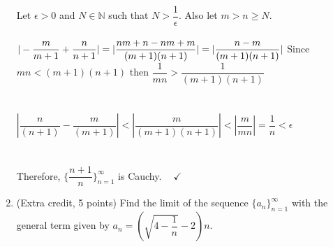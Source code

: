 \documentclass[fleqn]{article}
\begin{document}
\begin{enumerate}
      \textcolor{hwColor}{
        Let $\epsilon>0$ and $N \in \mathbb{N}$ such that $N >\dfrac{1}{\epsilon}$. Also let $m>n\geq N$.
        \\
        \\
        $
          |-\dfrac{m}{m+1}+\dfrac{n}{n+1}|=|\dfrac{nm+n-nm+m}{(m+1)(n+1)}|
          =|\dfrac{n-m}{(m+1)(n+1)}|
          \\
          \\
          \\
        $ 
        Since $mn<(m+1)(n+1)$ then $\dfrac{1}{mn}>\dfrac{1}{(m+1)(n+1)}$
        \\
        \\
        \\
        $
          |\dfrac{n}{(n+1)}-\dfrac{m}{(m+1)}|<|\dfrac{m}{(m+1)(n+1)}|<|\dfrac{m}{mn}|=\dfrac{1}{n}<\epsilon
        $
        \\
        \\
        \\
        Therefore, $\{\dfrac{n+1}{n}\}_{n=1}^{\infty}$ is Cauchy. $~~~~ \checkmark$
      }


    \item (Extra credit, 5 points) Find the limit of the sequence $\{a_n\}_{n=1}^{\infty}$ with the general term given by 
    $a_n=\left(\sqrt{4-\dfrac{1}{n}}-2\right)n$.


\end{enumerate}
\end{document}
